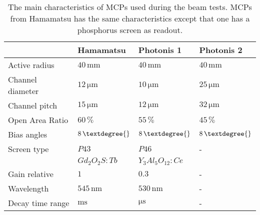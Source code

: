 \begin{table}[ht]
  \centering
  \caption[The main characteristics of MCPs used during the beam tests]{The main characteristics of MCPs used during the beam tests. MCPs from Hamamatsu has the same characteristics except that one has a phosphorus screen as readout.}
  \label{chap4:MCP_Phosphor}
  \begin{tabularx}{\linewidth}{lXXX}
    \toprule
                     & Hamamatsu                   & Photonis 1                  & Photonis 2                  \\
    \midrule
    Active radius    & $40\,\mathrm{mm}$           & $40\,\mathrm{mm}$           & $40\,\mathrm{mm}$           \\
    Channel diameter & $12\,\mathrm{\mu m}$        & $10\,\mathrm{\mu m}$        & $25\,\mathrm{\mu m}$        \\
    Channel pitch    & $15\,\mathrm{\mu m}$        & $12\,\mathrm{\mu m}$        & $32\,\mathrm{\mu m}$        \\
    Open Area Ratio  & $60\,\mathrm{\%}$           & $55\,\mathrm{\%}$           & $45\,\mathrm{\%}$           \\
    Bias angles      & $8\,\mathrm{\textdegree{}}$ & $8\,\mathrm{\textdegree{}}$ & $8\,\mathrm{\textdegree{}}$ \\
    \midrule
    Screen type      & $P43$                       & $P46$                       & -                           \\
                     & $Gd_{2}O_{2}S:Tb$           & $Y_{3}Al_{5}O_{12}:Ce$      &                             \\
    Gain relative    & $1$                         & $0.3$                       & -                           \\
    Wavelength       & $545\,\mathrm{nm}$          & $530\,\mathrm{nm}$          & -                           \\
    Decay time range & $\mathrm{ms}$               & $\mathrm{\mu s}$            & -                           \\
    \bottomrule
  \end{tabularx}
\end{table}